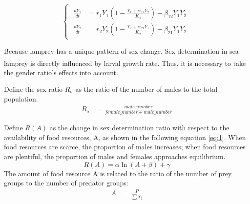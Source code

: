 \documentclass[12pt]{article}  %
\newcommand{\upcite}[1]{\textsuperscript{\textsuperscript{\cite{#1}}}}
\begin{document}
\begin{equation}
	\begin{cases}
		\begin{aligned}
			\frac{dY_1}{dt} &= r_1 Y_1 \left(1 - \frac{Y_1 + \alpha_{12} Y_2}{K_1}\right) - \beta_{12} Y_1 Y_2\\
			\frac{dY_2}{dt} &= r_2 Y_2 \left(1 - \frac{Y_2 + \alpha_{21} Y_1}{K_2}\right) - \beta_{21} Y_1 Y_2
		\end{aligned}
		\label{eq: 2}
	\end{cases}
\end{equation}
\par
Because lamprey has a unique pattern of sex change. Sex determination in sea lamprey is directly influenced by larval growth rate.\upcite{2} Thus, it is necessary to take the gender ratio's effects into account.\par

Define the sex ratio $R_{\sigma}$ as the ratio of the number of males to the total population:
\begin{equation}
	\begin{aligned}
	R_{\sigma} &=\frac{male\_number}{female\_number+male\_number}
	\end{aligned}
	\label{eq:gender_ratio}
\end{equation}

Define $R(A)$ as the change in sex determination  ratio with respect to the availability of food resources, A, as shown in the following equation \ref{eq:1}. When food resources are scarce, the proportion of males increases; when food resources are plentiful, the proportion of males and females approaches equilibrium.
\begin{equation}
	R(A) = \alpha \ln\left(A + \beta \right)+\gamma \label{eq:1}
\end{equation}
The amount of food resource A is related to the ratio of the number of prey groups to the number of predator groups:
\begin{equation}
	\begin{aligned}
		A &=\frac{P}{\sum Y_j}
	\end{aligned}
\end{equation}
\end{document}
